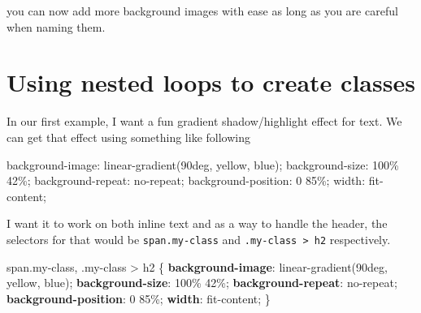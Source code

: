 \documentclass[
  letterpaper,
  DIV=11,
  numbers=noendperiod]{scrreprt}
\newenvironment{Shaded}{\begin{snugshade}}{\end{snugshade}}
\newcommand{\CharTok}[1]{\textcolor[rgb]{0.13,0.47,0.30}{#1}}
\newcommand{\ConstantTok}[1]{\textcolor[rgb]{0.56,0.35,0.01}{#1}}
\newcommand{\DataTypeTok}[1]{\textcolor[rgb]{0.68,0.00,0.00}{#1}}
\newcommand{\DecValTok}[1]{\textcolor[rgb]{0.68,0.00,0.00}{#1}}
\newcommand{\FunctionTok}[1]{\textcolor[rgb]{0.28,0.35,0.67}{#1}}
\newcommand{\InformationTok}[1]{\textcolor[rgb]{0.37,0.37,0.37}{#1}}
\newcommand{\KeywordTok}[1]{\textcolor[rgb]{0.00,0.23,0.31}{\textbf{#1}}}
\newcommand{\NormalTok}[1]{\textcolor[rgb]{0.00,0.23,0.31}{#1}}
\newcommand{\OperatorTok}[1]{\textcolor[rgb]{0.37,0.37,0.37}{#1}}
\begin{document}
you can now add more background images with ease as long as you are
careful when naming them.

\section{Using nested loops to create
classes}\label{using-nested-loops-to-create-classes}

In our first example, I want a fun gradient shadow/highlight effect for
text. We can get that effect using something like following

\begin{Shaded}
\begin{Highlighting}[]
\NormalTok{background{-}image}\InformationTok{:}\NormalTok{ linear{-}gradient}\InformationTok{(}\NormalTok{90deg}\OperatorTok{,}\NormalTok{ yellow}\OperatorTok{,}\NormalTok{ blue}\InformationTok{)}\NormalTok{;}
\NormalTok{background{-}size}\InformationTok{:}\NormalTok{ 100\% 42\%;}
\NormalTok{background{-}repeat}\InformationTok{:}\NormalTok{ no{-}repeat;}
\NormalTok{background{-}position}\InformationTok{:}\NormalTok{ 0 85\%;}
\NormalTok{width}\InformationTok{:}\NormalTok{ fit{-}content;}
\end{Highlighting}
\end{Shaded}

I want it to work on both inline text and as a way to handle the header,
the selectors for that would be \texttt{span.my-class} and
\texttt{.my-class\ \textgreater{}\ h2} respectively.

\begin{Shaded}
\begin{Highlighting}[]
\NormalTok{span}\FunctionTok{.my{-}class}\OperatorTok{,} \FunctionTok{.my{-}class} \OperatorTok{\textgreater{}}\NormalTok{ h2 \{}
  \KeywordTok{background{-}image}\CharTok{:} \FunctionTok{linear{-}gradient(}\DecValTok{90}\DataTypeTok{deg}\OperatorTok{,} \ConstantTok{yellow}\OperatorTok{,} \ConstantTok{blue}\FunctionTok{)}\OperatorTok{;}
  \KeywordTok{background{-}size}\CharTok{:} \DecValTok{100}\DataTypeTok{\%} \DecValTok{42}\DataTypeTok{\%}\OperatorTok{;}
  \KeywordTok{background{-}repeat}\CharTok{:} \DecValTok{no{-}repeat}\OperatorTok{;}
  \KeywordTok{background{-}position}\CharTok{:} \DecValTok{0} \DecValTok{85}\DataTypeTok{\%}\OperatorTok{;}
  \KeywordTok{width}\CharTok{:} \DecValTok{fit{-}content}\OperatorTok{;}
\NormalTok{\}}
\end{Highlighting}
\end{Shaded}
\end{document}
